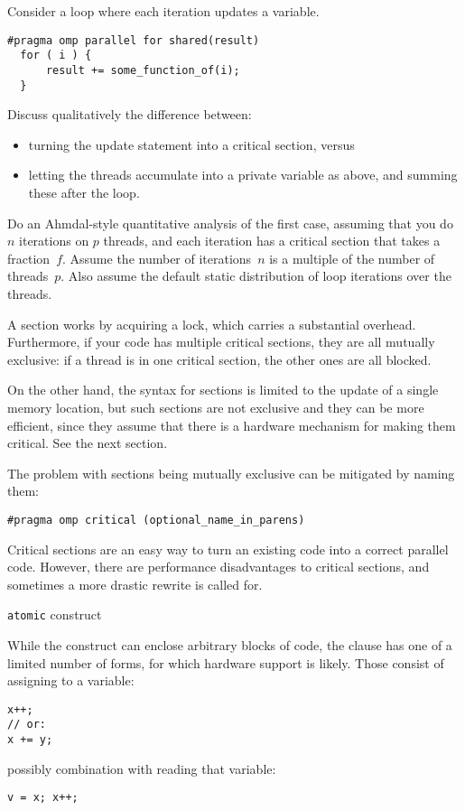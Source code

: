 \begin{exercise}
  Consider  a loop where each iteration updates a variable.
\begin{lstlisting}
#pragma omp parallel for shared(result)
  for ( i ) {
      result += some_function_of(i);
  }
\end{lstlisting}
  Discuss qualitatively
  the difference between:
  \begin{itemize}
  \item  turning the update statement into a critical section, versus
  \item letting the threads accumulate into a private variable  as above,
    and summing these after the loop.
  \end{itemize}  
  Do an Ahmdal-style quantitative analysis of the first case, assuming
  that you do $n$ iterations on $p$ threads, and each iteration has a
  critical section that takes a fraction~$f$.  Assume the number of
  iterations~$n$ is a multiple of the number of threads~$p$. Also
  assume the default static distribution of loop iterations over the
  threads.
\end{exercise}

A  section works by acquiring a lock, which carries a substantial overhead.
Furthermore, if your code has multiple critical sections, they are all mutually exclusive:
if a thread is in one critical section, the other ones are all blocked.

On the other hand, the syntax for  sections is limited to the update
of a single memory location, but such sections
are not exclusive and they can be more efficient, since they assume that there is a hardware
mechanism for making them critical. See the next section.

The problem with  sections being mutually exclusive can be mitigated by naming them:
\begin{lstlisting}
#pragma omp critical (optional_name_in_parens)
\end{lstlisting}

Critical sections are an easy way to turn an existing code into a correct parallel code.
However, there are performance disadvantages to critical sections,
and sometimes a more drastic rewrite
is called for.

 {\texttt{atomic} construct}
\label{sec:atomic}

While the  construct can enclose arbitrary blocks of code,
the  clause has one of a limited number of forms,
for which hardware support is likely.
Those consist of assigning to a variable:
\begin{lstlisting}
x++;
// or:
x += y;
\end{lstlisting}
possibly combination with reading that variable:
\begin{lstlisting}
v = x; x++;
\end{lstlisting}

